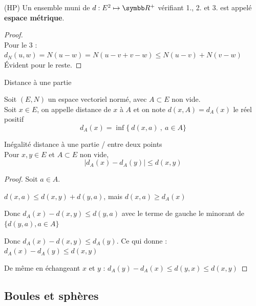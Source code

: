 \begin{remarque}
    (HP) Un ensemble muni de $d : E^2 \mapsto \R^{+}$ vérifiant 1., 2. et 3. est appelé \textbf{espace métrique}.
\end{remarque}

\begin{proof}~\\

    Pour le 3 : $d_N(u, w) = N(u - w) = N( u - v + v - w) \leqslant N(u - v) + N(v - w)$ \\

    Évident pour le reste.
\end{proof}

\begin{definition}{Distance à une partie}{}

    Soit $(E, N)$ un espace vectoriel normé, avec $A \subset E$ non vide. \\

    Soit $x \in E$, on appelle distance de $x$ à $A$ et on note $d(x, A) = d_A(x)$ le réel positif
    \[d_A(x) = \inf \{~ d(x, a) ~,~ a \in A\}\]
\end{definition}

\begin{proposition}{Inégalité distance à une partie / entre deux points}{}
    \\Pour $x, y \in E$ et $A \subset E$ non vide, 
    \[|d_A(x) - d_A(y)| \leqslant d(x, y)\]
\end{proposition}


\begin{proof}
    Soit $a \in A$.

    $d(x, a) \leqslant d(x, y) + d(y, a)$, mais $d(x, a) \geqslant d_A(x)$

    Donc $d_A(x) - d(x, y) \leqslant d(y, a)$ avec le terme de gauche le minorant de
    $\{d(y, a), a \in A\}$

    Donc $d_A(x) - d(x, y) \leqslant d_A(y)$.
    Ce qui donne : $d_A(x) - d_A(y) \leqslant d(x, y)$

    De même en échangeant $x$ et $y$ : $d_A(y) - d_A(x) \leqslant d(y, x) \leqslant d(x, y)$
\end{proof}

\subsection{Boules et sphères}

